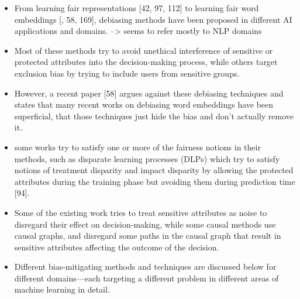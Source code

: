 \documentclass[12pt, a4paper, oneside]{book}   	%
\begin{document}
\begin{itemize}
				
				\item From learning fair representations [42, 97, 112] to learning fair word embeddings [\autocite{M20_Bolukbasi_2016}, 58, 169], debiasing methods have been proposed in different AI applications and domains. \autocite{Mehrabi_2021} --> seems to refer mostly to NLP domains
				\item Most of these methods try to avoid unethical interference of sensitive or protected attributes into the decision-making process, while others target exclusion bias by trying to include users from sensitive groups. \autocite{Mehrabi_2021}
				\item However, a recent paper [58] argues against these debiasing techniques and states that many recent works on debiasing word embeddings have been superficial, that those techniques just hide the bias and don’t actually remove it. \autocite{Mehrabi_2021}
				\item some works try to satisfy one or more of the fairness notions in their methods, such as disparate learning processes (DLPs) which try to satisfy notions of treatment disparity and impact disparity by allowing the protected attributes during the training phase but avoiding them during prediction time [94].\autocite{Mehrabi_2021}
				\item Some of the existing work tries to treat sensitive attributes as noise to disregard their effect on decision-making, while some causal methods use causal graphs, and disregard some paths in the causal graph that result in sensitive attributes affecting the outcome of the decision.\autocite{Mehrabi_2021}
				\item Different bias-mitigating methods and techniques are discussed below for different domains—each targeting a different problem in different areas of machine learning in detail. \autocite{Mehrabi_2021}
			\end{itemize}
			
\end{document}
